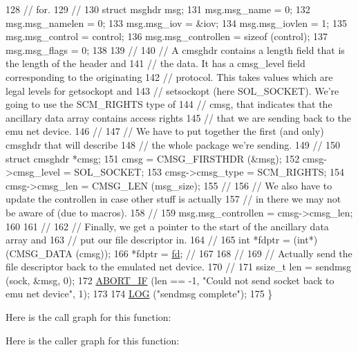 \begin{DoxyCode}
128   \textcolor{comment}{// for.}
129   \textcolor{comment}{//}
130   \textcolor{keyword}{struct }msghdr msg;
131   msg.msg\_name = 0;
132   msg.msg\_namelen = 0;
133   msg.msg\_iov = &iov;
134   msg.msg\_iovlen = 1;
135   msg.msg\_control = control;
136   msg.msg\_controllen = \textcolor{keyword}{sizeof} (control);
137   msg.msg\_flags = 0;
138 
139   \textcolor{comment}{//}
140   \textcolor{comment}{// A cmsghdr contains a length field that is the length of the header and}
141   \textcolor{comment}{// the data.  It has a cmsg\_level field corresponding to the originating}
142   \textcolor{comment}{// protocol.  This takes values which are legal levels for getsockopt and}
143   \textcolor{comment}{// setsockopt (here SOL\_SOCKET).  We're going to use the SCM\_RIGHTS type of}
144   \textcolor{comment}{// cmsg, that indicates that the ancillary data array contains access rights}
145   \textcolor{comment}{// that we are sending back to the emu net device.}
146   \textcolor{comment}{//}
147   \textcolor{comment}{// We have to put together the first (and only) cmsghdr that will describe}
148   \textcolor{comment}{// the whole package we're sending.}
149   \textcolor{comment}{//}
150   \textcolor{keyword}{struct }cmsghdr *cmsg;
151   cmsg = CMSG\_FIRSTHDR (&msg);
152   cmsg->cmsg\_level = SOL\_SOCKET;
153   cmsg->cmsg\_type = SCM\_RIGHTS;
154   cmsg->cmsg\_len = CMSG\_LEN (msg\_size);
155   \textcolor{comment}{//}
156   \textcolor{comment}{// We also have to update the controllen in case other stuff is actually}
157   \textcolor{comment}{// in there we may not be aware of (due to macros).}
158   \textcolor{comment}{//}
159   msg.msg\_controllen = cmsg->cmsg\_len;
160 
161   \textcolor{comment}{//}
162   \textcolor{comment}{// Finally, we get a pointer to the start of the ancillary data array and}
163   \textcolor{comment}{// put our file descriptor in.}
164   \textcolor{comment}{//}
165   \textcolor{keywordtype}{int} *fdptr = (\textcolor{keywordtype}{int}*)(CMSG\_DATA (cmsg));
166   *fdptr = \hyperlink{lte_2model_2fading-traces_2fading__trace__generator_8m_a44f21d5190b5a6df8089f54799628d7e}{fd}; \textcolor{comment}{//}
167 
168   \textcolor{comment}{//}
169   \textcolor{comment}{// Actually send the file descriptor back to the emulated net device.}
170   \textcolor{comment}{//}
171   ssize\_t len = sendmsg (sock, &msg, 0);
172   \hyperlink{creator-utils_8h_a91c11c90ad2f1672fbd3c031038dce16}{ABORT\_IF} (len == -1, \textcolor{stringliteral}{"Could not send socket back to emu net device"}, 1);
173 
174   \hyperlink{creator-utils_8h_a158a8c64f24645c7478298399825737f}{LOG} (\textcolor{stringliteral}{"sendmsg complete"});
175 \}
\end{DoxyCode}


Here is the call graph for this function\+:




Here is the caller graph for this function\+:


